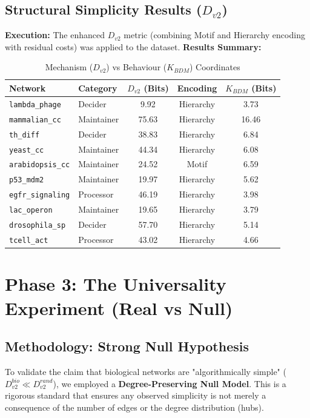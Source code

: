 \subsection{Structural Simplicity Results ($D_{v2}$)}
\textbf{Execution:} The enhanced $D_{v2}$ metric (combining Motif and Hierarchy encoding with residual costs) was applied to the dataset.
\textbf{Results Summary:}
\begin{table}[H]
\centering
\caption{Mechanism ($D_{v2}$) vs Behaviour ($K_{BDM}$) Coordinates}
\label{tab:results_real}
\begin{tabular}{@{}l l c c c@{}}
\toprule
\textbf{Network} & \textbf{Category} & \textbf{$D_{v2}$ (Bits)} & \textbf{Encoding} & \textbf{$K_{BDM}$ (Bits)} \\ \midrule
\texttt{lambda\_phage} & Decider & 9.92 & Hierarchy & 3.73 \\
\texttt{mammalian\_cc} & Maintainer & 75.63 & Hierarchy & 16.46 \\
\texttt{th\_diff} & Decider & 38.83 & Hierarchy & 6.84 \\
\texttt{yeast\_cc} & Maintainer & 44.34 & Hierarchy & 6.08 \\
\texttt{arabidopsis\_cc} & Maintainer & 24.52 & Motif & 6.59 \\
\texttt{p53\_mdm2} & Maintainer & 19.97 & Hierarchy & 5.62 \\
\texttt{egfr\_signaling} & Processor & 46.19 & Hierarchy & 3.98 \\
\texttt{lac\_operon} & Maintainer & 19.65 & Hierarchy & 3.79 \\
\texttt{drosophila\_sp} & Decider & 57.70 & Hierarchy & 5.14 \\
\texttt{tcell\_act} & Processor & 43.02 & Hierarchy & 4.66 \\ \bottomrule
\end{tabular}
\end{table}

\section{Phase 3: The Universality Experiment (Real vs Null)}

\subsection{Methodology: Strong Null Hypothesis}
To validate the claim that biological networks are "algorithmically simple" ($D_{v2}^{bio} \ll D_{v2}^{rand}$), we employed a \textbf{Degree-Preserving Null Model}. This is a rigorous standard that ensures any observed simplicity is not merely a consequence of the number of edges or the degree distribution (hubs).

